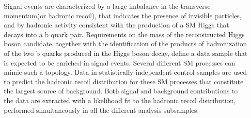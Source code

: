 Signal events are characterized by a large imbalance in the transverse
momentum(or hadronic recoil), that indicates the presence of invisible
particles, and by hadronic activity consistent with the production of
a SM Higgs that decays into a b quark pair. Requirements on the mass
of the reconstructed Higgs boson candidate, together with the
identification of the products of hadronization of the two b quarks
produced in the Higgs boson decay, define a data sample that is
expected to be enriched in signal events. Several different SM
processes can mimic such a topology. Data in statistically independent control samples are used to predict the hadronic recoil distribution for these SM processes that constitute the largest source of background.
Both signal and background contributions to the data are extracted with a likelihood fit to the hadronic recoil distribution, performed simultaneously in all the different analysis subsamples.
